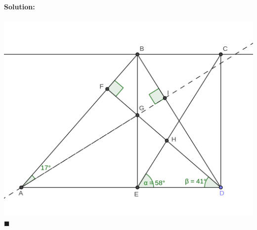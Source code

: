 \documentclass{article}
\newenvironment{solution}{\paragraph{Solution:}}{\hfill$\blacksquare$}
\begin{document}
\begin{enumerate}
\begin{solution}
		\includegraphics[width=0.6\linewidth]{PMO17_20s}
	\end{solution}
	
\end{enumerate}
\end{document}
